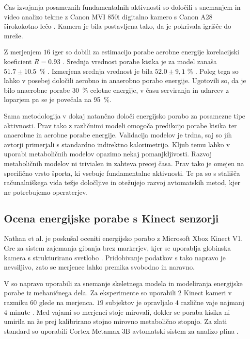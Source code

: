 Čas izvajanja posameznih fundamentalnih aktivnosti so določili s snemanjem in video analizo tekme z Canon MVI 850i digitalno kamero s Canon A28 širokokotno lečo \cite{botton2011energy}. Kamera je bila postavljena %
tako, da je pokrivala igrišče do mreže. 

Z merjenjem $16$ iger so dobili za estimacijo porabe aerobne energije korelacijski koeficient $R = 0.93$ \cite{botton2011energy}. Srednja vrednost porabe kisika je za model zanaša $51.7 \pm 10.5$~\% \vomax. Izmerjena srednja vrednost je bila $52.0 \pm 9,1$ \% \vomax. Poleg tega so lahko 
v \cite{botton2011energy} posebej določili aerobno in anaerobno porabo energije. Ugotovili so, da je bilo anaerobne porabe \SI{30}{\%} celotne energije, v času serviranja in udarcev z loparjem pa se je povečala na \SI{95}{\%}.  

Sama metodologija v \cite{botton2011energy} dokaj natančno določi energijsko porabo za posamezne tipe aktivnosti. Prav tako z različnimi modeli omogoča predikcijo porabe kisika ter anaerobne in aerobne porabe energije. Validacija modelov je trdna, saj so jih avtorji primerjali s standardno indirektno kalorimetrijo. Kljub temu lahko v uporabi metaboličnih modelov opazimo nekaj pomanjkljivosti. Razvoj metaboličnih modelov ni trivialen in zahteva precej časa. Prav tako je omejen na specifično vrsto športa, ki vsebuje fundamentalne aktivnosti. Te pa so s stališča računalniškega vida težje določljive in otežujejo razvoj avtomatskih metod, kjer ne potrebujemo operaterjev.




\subsection{Ocena energijske porabe s Kinect senzorji}

Nathan et al. \cite{nathan2015estimating} je poskušal oceniti energijsko porabo z Microsoft Xbox Kinect V1. Gre za sistem zajemanja gibanja brez markerjev, kjer se uporablja globinska kamera s strukturirano svetlobo \cite{nathan2015estimating}. Pridobivanje podatkov s tako napravo je nevsiljivo, zato se merjenec lahko premika svobodno in naravno. 

V \cite{nathan2015estimating} so napravo uporabili za snemanje skeletnega modela in modeliranja energijske porabe iz mehaničnega dela. Za eksperimente so uporabili $2$ Kinect kameri v razmiku \SI{60}{\stopinj} glede na merjenca. $19$ subjektov je opravljalo $4$ različne vaje najmanj $4$ minute \cite{nathan2015estimating}. Med vajami so merjenci stoje mirovali, dokler se poraba kisika ni umirila na že prej kalibrirano stojno mirovno metabolično stopnjo. Za zlati standard so uporabili Cortex Metamax 3B avtomatski sistem za analizo plina \cite{nathan2015estimating}.


